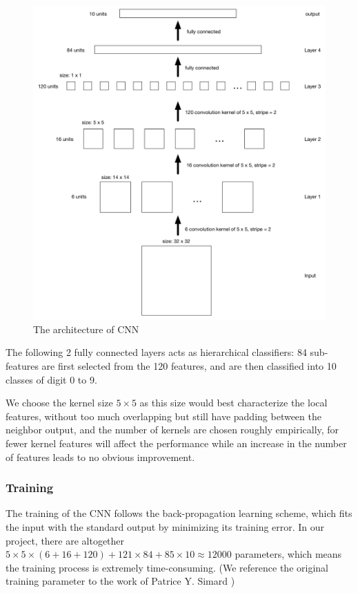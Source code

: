 \documentclass[12pt]{article}
\begin{document}
\begin{figure}[tbp]
	\centering
	\includegraphics[width =\textwidth]{cnn}		
	\caption{The architecture of CNN}
	\label{fig:arch}
\end{figure}

The following 2 fully connected layers acts as hierarchical classifiers: 84 sub-features are first selected from the 120 features, and are then classified into 10 classes of digit 0 to 9.

We choose the kernel size  $5\times 5$ as this size would best characterize the local features, without too much overlapping but still have padding between the neighbor output, and the number of kernels are chosen roughly empirically, for fewer kernel features will affect the performance while  an increase in the number of features leads to no obvious improvement. 


\subsubsection{Training}

The training of the CNN follows the back-propagation learning scheme\cite{lecun1989backpropagation}, which fits the input with the standard output by minimizing its training error.
In our project, there are altogether $5\times 5\times(6+16+120)+121\times84+85\times10 \approx 12000$ parameters, which means the training process is extremely time-consuming. 
(We reference the original training parameter to the work of Patrice Y. Simard \cite{simard2003best})
\end{document}
